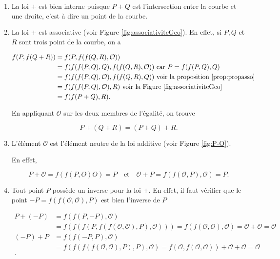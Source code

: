 \begin{demonstration}
    \begin{enumerate}
        \item La loi $+$ est bien interne puisque $P + Q$ est l'intersection entre la courbe et
            une droite, c'est à dire un point de la courbe.

        \item La loi $+$ est associative (voir Figure \ref{fig:associativiteGeo}). En effet, si $P,Q$ et $R$ sont trois
            point de la courbe, on a

            \begin{align*}
            f(P,f(Q+R)) &= f(P,f(f(Q,R),\mathcal{O})) \\
            &= f(f(f(P,Q),Q),f(f(Q,R),\mathcal{O})) \text{ car } P = f(f(P,Q),Q) \\
            &= f(f(f(P,Q),\mathcal{O}),f(f(Q,R),Q)) \text{ voir la proposition
            \ref{prop:propasso} } \\
            &= f(f(f(P,Q),\mathcal{O}),R) \text{ voir la Figure \ref{fig:associativiteGeo}} \\
            &= f(f(P+Q),R)
            .\end{align*}

            En appliquant $\mathcal{O}$ sur les deux membres de l'égalité, on trouve

            \[
            P + (Q+R) = (P+Q) + R
            .\] 

        \item L'élément $\mathcal{O}$ est l'élément neutre de la loi additive (voir Figure
            \ref{fig:P-O}). 

            En effet,

            \[
            P + \mathcal{O} = f(f(P,O)O) = P \quad \text{et} \quad \mathcal{O}+P =
            f(f(\mathcal{O},P),\mathcal{O}) = P
            .\] 

        \item Tout point $P$ possède un inverse pour la loi $+$. En effet, il faut vérifier que
            le point $-P= f(f(\mathcal{O},\mathcal{O}),P)$ est bien l'inverse de $P$ 

            \begin{align*}
                P + (-P) &= f(f(P,-P),\mathcal{O}) \\
                &= f(f(f(P,f(f(\mathcal{O},\mathcal{O}),P),\mathcal{O}))) =
                f(f(\mathcal{O},\mathcal{O}),\mathcal{O}) =
                \mathcal{O}+\mathcal{O}=\mathcal{O}  \\
                (-P) + P &= f(f(-P,P),\mathcal{O}) \\
                &= f(f(f(f(\mathcal{O},\mathcal{O}),P),P),\mathcal{O}) =
                f(\mathcal{O},f(\mathcal{O},\mathcal{O})) + \mathcal{O}+\mathcal{O}=
                \mathcal{O} \\
            .\end{align*}


\end{enumerate}
\end{demonstration}
